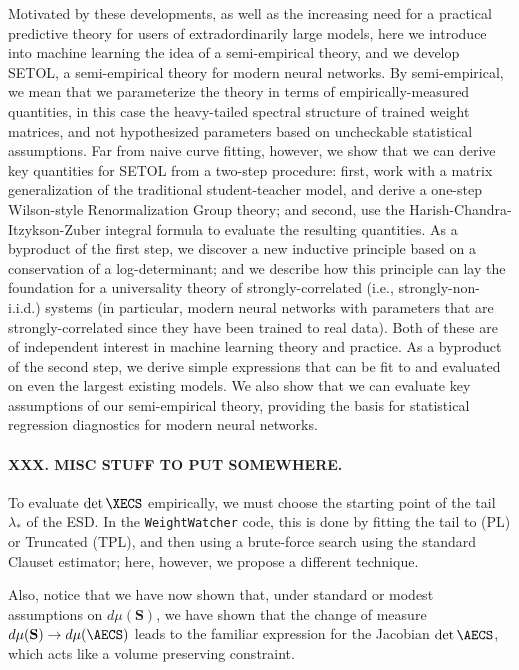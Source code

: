 Motivated by these developments, as well as the increasing need for a practical predictive theory for users of extradordinarily large models, here we introduce into machine learning the idea of a semi-empirical theory, and we develop SETOL, a semi-empirical theory for modern neural networks.
By semi-empirical, we mean that we parameterize the theory in terms of empirically-measured quantities, in this case the heavy-tailed spectral structure of trained weight matrices, and not hypothesized parameters based on uncheckable statistical assumptions.
Far from naive curve fitting, however, we show that we can derive key quantities for SETOL from a two-step procedure: first, work with a matrix generalization of the traditional student-teacher model, and derive a one-step Wilson-style Renormalization Group theory; and second, use the Harish-Chandra-Itzykson-Zuber integral formula to evaluate the resulting quantities.
As a byproduct of the first step, we discover a new inductive principle based on a conservation of a log-determinant; and we describe how this principle can lay the foundation for a universality theory of strongly-correlated (i.e., strongly-non-i.i.d.) systems (in particular, modern neural networks with parameters that are strongly-correlated since they have been trained to real data).
Both of these are of independent interest in machine learning theory and practice.
As a byproduct of the second step, we derive simple expressions that can be fit to and evaluated on even the largest existing models.
We also show that we can evaluate key assumptions of our semi-empirical theory, providing the basis for statistical regression diagnostics for modern neural networks.





\paragraph{XXX.  MISC STUFF TO PUT SOMEWHERE.}

To evaluate $\det\XECS$ empirically, we must choose the starting point of the tail $\lambda_{*}$ of the ESD.
In the {\texttt{WeightWatcher}} code, this is done by fitting the tail to \PowerLaw (PL) or Truncated \PowerLaw (TPL), and then using
a brute-force search using the standard Clauset estimator; here, however, we propose a different technique.

Also, notice that we have now shown that, under standard or modest
 assumptions on $d\mu(\mathbf{S})$, 
we have shown that the change of measure $d\mu(\mathbf{S})\rightarrow d\mu(\AECS)$
leads to the familiar expression for the Jacobian $\det\AECS$, which acts
like a volume preserving constraint.

